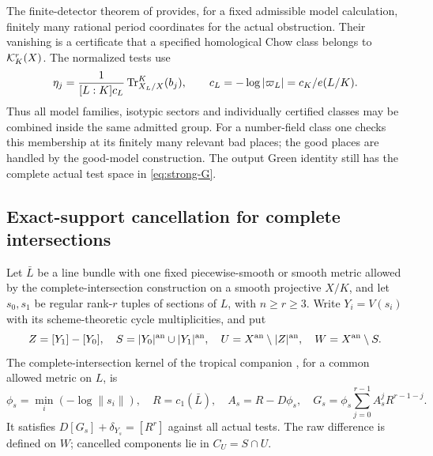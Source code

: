 The finite-detector theorem of \cite{InternalDetectors} provides,
for a fixed admissible model calculation, finitely many rational
period coordinates for the actual obstruction. Their vanishing
is a certificate that a specified homological Chow class belongs
to $\mathcal K_K^r(X)$. The normalized tests use
\[
 \eta_j=\frac{1}{[L:K]c_L}\operatorname{Tr}^K_{X_L/X}(b_j),\qquad
 c_L=-\log|\varpi_L|=c_K/e(L/K).
\]
Thus all model families, isotypic sectors and individually certified
classes may be combined inside the same admitted group. For a
number-field class one checks this membership at its finitely many
relevant bad places; the good places are handled by the good-model
construction. The output Green identity still has the complete
actual test space in \eqref{eq:strong-G}.

\subsection{Exact-support cancellation for complete intersections}

Let $\bar L$ be a line bundle with one fixed piecewise-smooth or
smooth metric allowed by the complete-intersection construction
on a smooth projective $X/K$, and let
$s_0,s_1$ be regular rank-$r$ tuples of sections of $L$, with
$n\geq r\geq3$. Write $Y_i=V(s_i)$ with its scheme-theoretic
cycle multiplicities, and put
\[
 Z=[Y_1]-[Y_0],\quad
 S=|Y_0|^{\mathrm{an}}\cup|Y_1|^{\mathrm{an}},\quad
 U=X^{\mathrm{an}}\setminus|Z|^{\mathrm{an}},\quad W=X^{\mathrm{an}}\setminus S.
\]
The complete-intersection kernel of the tropical companion
\cite{InternalTropical}, for a common allowed metric on $L$, is
\begin{equation}\label{eq:ci-kernel}
 \phi_s=\min_i(-\log\|s_i\|),\quad
 R=c_1(\bar L),\quad A_s=R-D\phi_s,\quad
 G_s=\phi_s\sum_{j=0}^{r-1}A_s^jR^{r-1-j}.
\end{equation}
It satisfies $D[G_s]+\delta_{Y_s}=[R^r]$ against all actual
tests. The raw difference is defined on $W$; cancelled components
lie in $C_U=S\cap U$.

